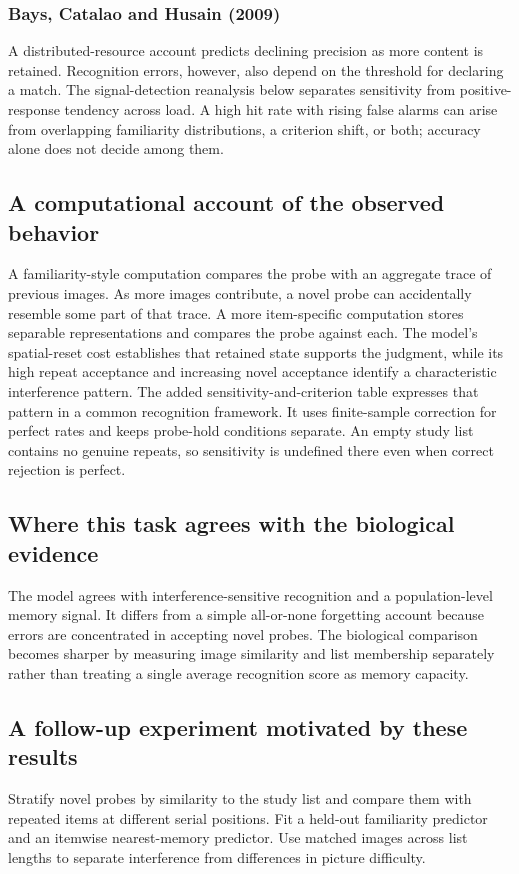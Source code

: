 \documentclass[11pt]{article}
\begin{document}
\subsubsection{Bays, Catalao and Husain (2009)}
A distributed-resource account predicts declining precision as more content is retained. Recognition errors, however, also depend on the threshold for declaring a match. The signal-detection reanalysis below separates sensitivity from positive-response tendency across load. A high hit rate with rising false alarms can arise from overlapping familiarity distributions, a criterion shift, or both; accuracy alone does not decide among them. \cite{bio_bays}

\subsection{A computational account of the observed behavior}
A familiarity-style computation compares the probe with an aggregate trace of previous images. As more images contribute, a novel probe can accidentally resemble some part of that trace. A more item-specific computation stores separable representations and compares the probe against each. The model’s spatial-reset cost establishes that retained state supports the judgment, while its high repeat acceptance and increasing novel acceptance identify a characteristic interference pattern. The added sensitivity-and-criterion table expresses that pattern in a common recognition framework. It uses finite-sample correction for perfect rates and keeps probe-hold conditions separate. An empty study list contains no genuine repeats, so sensitivity is undefined there even when correct rejection is perfect.

\subsection{Where this task agrees with the biological evidence}
The model agrees with interference-sensitive recognition and a population-level memory signal. It differs from a simple all-or-none forgetting account because errors are concentrated in accepting novel probes. The biological comparison becomes sharper by measuring image similarity and list membership separately rather than treating a single average recognition score as memory capacity.

\subsection{A follow-up experiment motivated by these results}
Stratify novel probes by similarity to the study list and compare them with repeated items at different serial positions. Fit a held-out familiarity predictor and an itemwise nearest-memory predictor. Use matched images across list lengths to separate interference from differences in picture difficulty.
\end{document}
